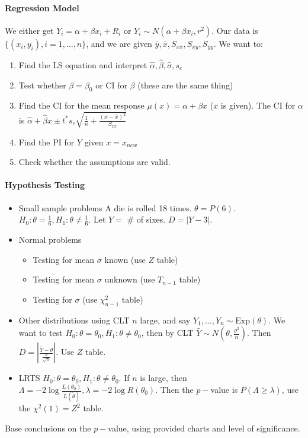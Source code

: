 \documentclass[10pt,letter]{article}
\theoremstyle{plain}
\theoremstyle{definition}
\begin{document}
\paragraph{Regression Model}
We either get $Y_i=\alpha+\beta x_i+R_i$ or $Y_i\sim N(\alpha+\beta x_i,r^2)$. Our data is $\{(x_i,y_i),i=1,\ldots,n\}$, and we are given $\bar{y},\bar{x},S_{xx},S_{xy},S_{yy}$. We want to:
\begin{enumerate}
    \item Find the LS equation and interpret $\hat{\alpha},\hat{\beta},\hat\sigma,s_e$ 
    \item Test whether $\beta=\beta_0$ or CI for $\beta$ (these are the same thing)
    \item Find the CI for the mean response $\mu(x)=\alpha+\beta x$  ($x$ is given). The CI for $\alpha$ is $\hat\alpha+\hat\beta x\pm t^*s_e\sqrt{\frac{1}{n}+\frac{(x-\bar{x})^2}{S_{xx}}}$
    \item Find the PI for $Y$ given $x=x_{new}$ 
    \item Check whether the assumptions are valid. 
\end{enumerate}
\paragraph{Hypothesis Testing} 
\begin{itemize}
    \item Small sample problems 
    A die is rolled 18 times. $\theta=P(6)$. $H_0:\theta=\frac{1}{6},H_1:\theta\neq\frac{1}{6}$. Let $Y=$ \# of sixes. $D=|Y-3|$.
    \item Normal problems \begin{itemize}
        \item Testing for mean $\sigma$ known (use $Z$ table)
        \item Testing for mean $\sigma$ unknown (use $T_{n-1}$ table)
        \item Testing for $\sigma$ (use $\chi^2_{n-1}$ table)
    \end{itemize}
    \item Other distributions using CLT 
    $n$ large, and say $Y_1,\ldots,Y_n\sim \text{Exp}(\theta)$. We want to test $H_0:\theta=\theta_0,H_1:\theta\neq\theta_0$, then by CLT $\bar{Y}\sim N\left(\theta,\frac{\theta^2}{n}\right)$. Then $D=\left|\frac{\bar{Y}-\theta}{\frac{\theta}{\sqrt{n}}}\right|$. Use $Z$ table. 
    \item LRTS
    $H_0:\theta=\theta_0,H_1:\theta\neq\theta_0$. If $n$ is large, then $\Lambda=-2\log\frac{L(\theta_0)}{L(\tilde\theta)},\lambda=-2\log R(\theta_0)$. Then the $p-$value is $P(\Lambda\geq\lambda)$, use the $\chi^2(1)=Z^2$ table. 
\end{itemize}
Base conclusions on the $p-$value, using provided charts and level of significance. 
\end{document}
